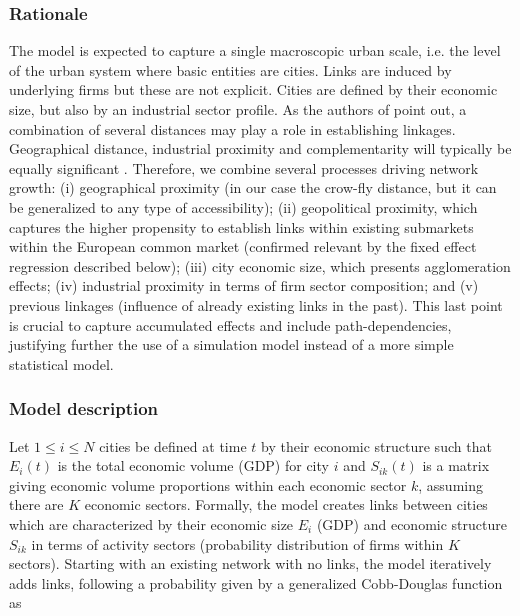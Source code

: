 \documentclass[10pt,letterpaper]{article}
\begin{document}
\subsubsection*{Rationale}

The model is expected to capture a single macroscopic urban scale, i.e. the level of the urban system where basic entities are cities. Links are induced by underlying firms but these are not explicit. Cities are defined by their economic size, but also by an industrial sector profile. As the authors of \cite{martinus2018global} point out, a combination of several distances may play a role in establishing linkages. Geographical distance, industrial proximity and complementarity will typically be equally significant \cite{cottineau2020nested}. Therefore, we combine several processes driving network growth: (i) geographical proximity (in our case the crow-fly distance, but it can be generalized to any type of accessibility); (ii) geopolitical proximity, which captures the higher propensity to establish links within existing submarkets within the European common market (confirmed relevant by the fixed effect regression described below); (iii) city economic size, which presents agglomeration effects; (iv) industrial proximity in terms of firm sector composition; and (v) previous linkages (influence of already existing links in the past). This last point is crucial to capture accumulated effects and include path-dependencies, justifying further the use of a simulation model instead of a more simple statistical model.


\subsubsection*{Model description}

Let $1 \leq i \leq N$ cities be defined at time $t$ by their economic structure such that $E_i(t)$ is the total economic volume (GDP) for city $i$ and $S_{ik}(t)$ is a matrix giving economic volume proportions within each economic sector $k$, assuming there are $K$ economic sectors. Formally, the model creates links between cities which are characterized by their economic size $E_i$ (GDP) and economic structure $S_{ik}$ in terms of activity sectors (probability distribution of firms within $K$ sectors). Starting with an existing network with no links, the model iteratively adds links, following a probability given by a generalized Cobb-Douglas function \cite{vilcu2011geometric} as 
\end{document}
